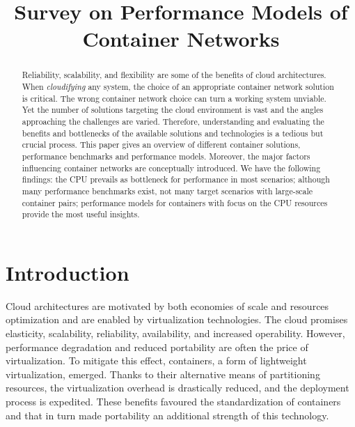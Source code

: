\documentclass[conference]{IEEEtran}
\begin{document}
%
\title{Survey on Performance Models of Container Networks}


\author{
}

\maketitle

\begin{abstract}
Reliability, scalability, and flexibility are some of the benefits of cloud architectures.  When \textit{cloudifying} any system, the choice of an appropriate container network solution is critical. The wrong container network choice can turn a working system unviable. %
Yet the number of solutions targeting the cloud environment is vast and the angles approaching the challenges are varied. Therefore, understanding and evaluating the benefits and bottlenecks of the available solutions and technologies is a tedious but crucial process. This paper gives an overview of different container solutions, performance benchmarks and performance models. Moreover, the major factors influencing container networks are conceptually introduced. We have the following findings: the CPU prevails as bottleneck for performance in most scenarios; although many performance benchmarks exist, not many target scenarios with large-scale container pairs; performance models for containers with focus on the CPU resources provide the most useful insights. 
\end{abstract}


\section{Introduction}
Cloud architectures are motivated by both economies of scale and resources optimization and are enabled by virtualization technologies. The cloud promises elasticity, scalability, reliability, availability, and increased operability. However, performance degradation and reduced portability are often the price of virtualization. To mitigate this effect, containers, a form of lightweight virtualization, emerged. Thanks to their alternative means of partitioning resources, the virtualization overhead is drastically reduced, and the deployment process is expedited. These benefits favoured the standardization of containers and that in turn made portability an additional strength of this technology.
\end{document}
